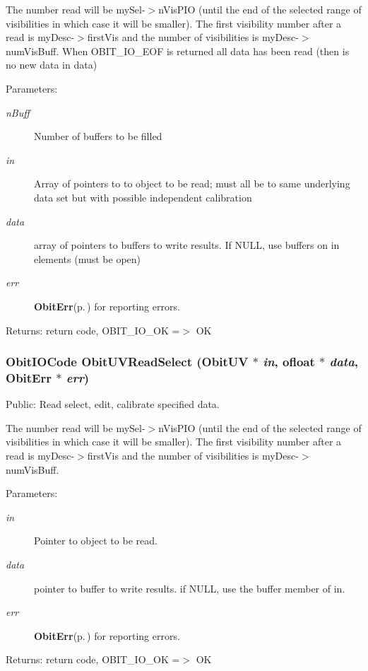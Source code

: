 The number read will be my\-Sel-$>$n\-Vis\-PIO (until the end of the selected range of visibilities in which case it will be smaller). The first visibility number after a read is my\-Desc-$>$first\-Vis and the number of visibilities is my\-Desc-$>$num\-Vis\-Buff. When OBIT\_\-IO\_\-EOF is returned all data has been read (then is no new data in data) \begin{Desc}
\item[Parameters:]
\begin{description}
\item[{\em n\-Buff}]Number of buffers to be filled \item[{\em in}]Array of pointers to to object to be read; must all be to same underlying data set but with possible independent calibration \item[{\em data}]array of pointers to buffers to write results. If NULL, use buffers on in elements (must be open) \item[{\em err}]{\bf Obit\-Err}{\rm (p.\,\pageref{structObitErr})} for reporting errors. \end{description}
\end{Desc}
\begin{Desc}
\item[Returns:]return code, OBIT\_\-IO\_\-OK =$>$ OK \end{Desc}
\subsubsection{\setlength{\rightskip}{0pt plus 5cm}Obit\-IOCode Obit\-UVRead\-Select ({\bf Obit\-UV} $\ast$ {\em in}, {\bf ofloat} $\ast$ {\em data}, {\bf Obit\-Err} $\ast$ {\em err})}\label{ObitUV_8c_a25}


Public: Read select, edit, calibrate specified data. 

The number read will be my\-Sel-$>$n\-Vis\-PIO (until the end of the selected range of visibilities in which case it will be smaller). The first visibility number after a read is my\-Desc-$>$first\-Vis and the number of visibilities is my\-Desc-$>$num\-Vis\-Buff. \begin{Desc}
\item[Parameters:]
\begin{description}
\item[{\em in}]Pointer to object to be read. \item[{\em data}]pointer to buffer to write results. if NULL, use the buffer member of in. \item[{\em err}]{\bf Obit\-Err}{\rm (p.\,\pageref{structObitErr})} for reporting errors. \end{description}
\end{Desc}
\begin{Desc}
\item[Returns:]return code, OBIT\_\-IO\_\-OK =$>$ OK \end{Desc}
